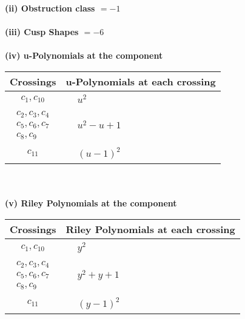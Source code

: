\documentclass[1p]{elsarticle_modified}
\theoremstyle{definition}
\begin{document}
\flushleft \textbf{(ii) Obstruction class $= -1$}\\~\\
\flushleft \textbf{(iii) Cusp Shapes $= -6$}\\~\\
\newpage\renewcommand{\arraystretch}{1}
\flushleft \textbf{(iv) u-Polynomials at the component}\newline \\
\begin{tabular}{m{50pt}|m{274pt}}
Crossings & \hspace{64pt}u-Polynomials at each crossing \\
\hline $$\begin{aligned}c_{1},c_{10}\end{aligned}$$&$\begin{aligned}
&u^2
\end{aligned}$\\
\hline $$\begin{aligned}c_{2},c_{3},c_{4}\\c_{5},c_{6},c_{7}\\c_{8},c_{9}\end{aligned}$$&$\begin{aligned}
&u^2- u+1
\end{aligned}$\\
\hline $$\begin{aligned}c_{11}\end{aligned}$$&$\begin{aligned}
&(u-1)^2
\end{aligned}$\\
\hline
\end{tabular}\\~\\
\newpage\renewcommand{\arraystretch}{1}
\flushleft \textbf{(v) Riley Polynomials at the component}\newline \\
\begin{tabular}{m{50pt}|m{274pt}}
Crossings & \hspace{64pt}Riley Polynomials at each crossing \\
\hline $$\begin{aligned}c_{1},c_{10}\end{aligned}$$&$\begin{aligned}
&y^2
\end{aligned}$\\
\hline $$\begin{aligned}c_{2},c_{3},c_{4}\\c_{5},c_{6},c_{7}\\c_{8},c_{9}\end{aligned}$$&$\begin{aligned}
&y^2+y+1
\end{aligned}$\\
\hline $$\begin{aligned}c_{11}\end{aligned}$$&$\begin{aligned}
&(y-1)^2
\end{aligned}$\\
\hline
\end{tabular}\\~\\
\end{document}
